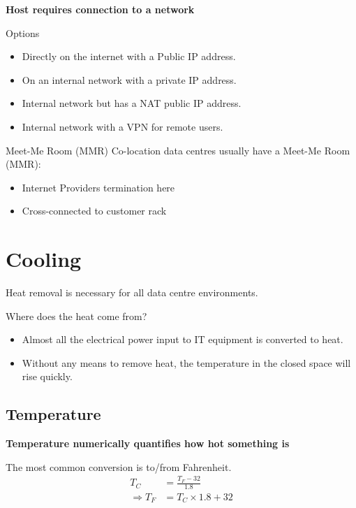 \documentclass[slides]{pgnotes}
\begin{document}
\textbf{Host requires connection to a network}

\begin{greenbox}{Options}
  \begin{itemize}
  \item Directly on the internet with a Public IP address.
  \item On an internal network with a private IP address.
  \item Internal network but has a NAT public IP address.
  \item Internal network with a VPN for remote users.
  \end{itemize}
\end{greenbox}

\begin{bluebox}{Meet-Me Room (MMR)}
  Co-location data centres usually have a Meet-Me Room (MMR):
  \begin{itemize}
  \item Internet Providers termination here
  \item Cross-connected to customer rack
  \end{itemize}
\end{bluebox}

\section{Cooling}

Heat removal is necessary for all data centre environments.

\begin{bluebox}{Where does the heat come from?}
  \begin{itemize}
  \item Almost all the electrical power input to IT equipment is converted to heat.
\item Without any means to remove heat, the temperature in the closed space will rise quickly.
  \end{itemize}
\end{bluebox}


\subsection{Temperature}
\label{sec:temperature}

\textbf{Temperature numerically quantifies how hot something is}

The most common conversion is to/from Fahrenheit.
\begin{align}
  T_C & = \frac{T_F-32}{1.8} \label{eq:f-to-c} \\
  \Rightarrow  T_F & = T_C \times 1.8 + 32 \label{eq:c-to-f}
\end{align}
\end{document}
